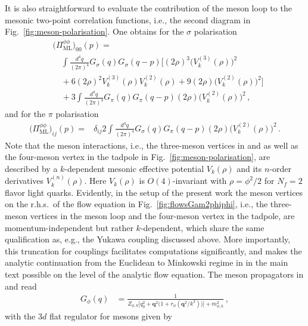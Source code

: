 \documentclass[reprint,english,superscriptaddress,preprintnumbers,amsmath,amssymb,aps,prd,nofootinbib]{revtex4-2}
\def\Fig#1{Fig.~\ref{#1}}
\begin{document}
%
It is also straightforward to evaluate the contribution of the meson loop to the mesonic two-point correlation functions, i.e., the second diagram in \Fig{fig:meson-polarisation}. 
One obtains for the $\sigma$ polarisation
%
\begin{align}
\nonumber
  &\big(\Pi^{\phi\phi}_{\mathrm{ML}}\big)_{00}(p)=\\[2ex] \nonumber
  &\quad\int \frac{d^4 q}{(2\pi)^4} G_{\sigma}(q) G_{\sigma}(q-p)\Big[ (2\rho)^3\big(V_k^{(3)}(\rho)\big)^2\\[2ex] \nonumber
  &\quad+6 (2\rho)^2 V_k^{(3)}(\rho) V_k^{(2)}(\rho)+9 (2\rho) \big(V_k^{(2)}(\rho)\big)^2\Big]\nonumber \\[2ex]
 &\quad+3\int \frac{d^4 q}{(2\pi)^4} G_{\pi}(q) G_{\pi}(q-p) (2\rho) \big(V_k^{(2)}(\rho)\big)^2\,,\label{eq:Pisigma-ML}
\end{align}
%
and for the $\pi$ polarisation
%
\begin{align}
  \big(\Pi^{\phi\phi}_{\mathrm{ML}}\big)_{ij}(p)=&\delta_{ij} 2\int \frac{d^4 q}{(2\pi)^4} G_{\sigma}(q) G_{\pi}(q-p) (2\rho) \big(V_k^{(2)}(\rho)\big)^2\,.\label{eq:Pipi-ML}
\end{align}
%
Note that the meson interactions, i.e., the three-meson vertices in  and  as well as the four-meson vertex in the tadpole in \Fig{fig:meson-polarisation}, are described by a $k$-dependent mesonic effective potential $V_k(\rho)$ and its $n$-order derivatives $V_k^{(n)}(\rho)$. 
Here $V_k(\rho)$ is $O(4)$-invariant with $\rho=\phi^2/2$ for $N_f=2$ flavor light quarks. Evidently, in the setup of the present work the meson vertices on the r.h.s.\ of the flow equation in \Fig{fig:flowsGam2phiphi}, i.e., the three-meson vertices in the meson loop and the four-meson vertex in the tadpole, are momentum-independent but rather $k$-dependent, which share the same qualification as, e.g., the Yukawa coupling discussed above. 
More importantly, this truncation for couplings facilitates computations significantly, and makes the analytic continuation from the Euclidean to Minkowski regime in  in the main text possible on the level of the analytic flow equation. 
The meson propagators in  and  read
%
\begin{align}
  G_{\phi}(q)&=\frac{1}{Z_{\phi,k} \Big[q_0^2+\boldsymbol{q}^2\big(1+r_{\phi}(\boldsymbol{q}^2/k^2)\big)\Big]+m_{\phi,k}^2} \,,\label{eq:Gphi}
\end{align}
%
with the $3d$ flat regulator for mesons given by
\end{document}
